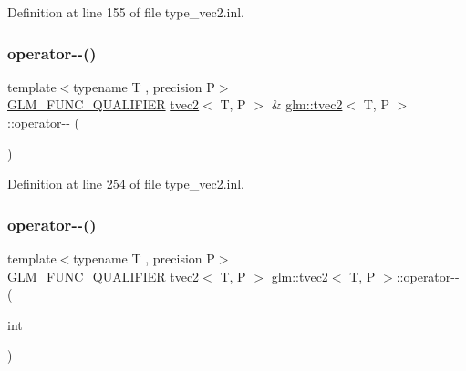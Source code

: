 Definition at line 155 of file type\+\_\+vec2.\+inl.

\mbox{\label{structglm_1_1tvec2_af751da3c19f0f22f8eb2bac9003f9384}} 
\subsubsection{\texorpdfstring{operator-\/-\/()}{operator--()}\hspace{0.1cm}{\footnotesize\ttfamily [1/2]}}
{\footnotesize\ttfamily template$<$typename T , precision P$>$ \\
\mbox{\hyperlink{setup_8hpp_a33fdea6f91c5f834105f7415e2a64407}{G\+L\+M\+\_\+\+F\+U\+N\+C\+\_\+\+Q\+U\+A\+L\+I\+F\+I\+ER}} \mbox{\hyperlink{structglm_1_1tvec2}{tvec2}}$<$ T, P $>$ \& \mbox{\hyperlink{structglm_1_1tvec2}{glm\+::tvec2}}$<$ T, P $>$\+::operator-\/-\/ (\begin{DoxyParamCaption}{ }\end{DoxyParamCaption})}



Definition at line 254 of file type\+\_\+vec2.\+inl.

\mbox{\label{structglm_1_1tvec2_a4206b03754b7b3ba80a3a9365755f882}} 
\subsubsection{\texorpdfstring{operator-\/-\/()}{operator--()}\hspace{0.1cm}{\footnotesize\ttfamily [2/2]}}
{\footnotesize\ttfamily template$<$typename T , precision P$>$ \\
\mbox{\hyperlink{setup_8hpp_a33fdea6f91c5f834105f7415e2a64407}{G\+L\+M\+\_\+\+F\+U\+N\+C\+\_\+\+Q\+U\+A\+L\+I\+F\+I\+ER}} \mbox{\hyperlink{structglm_1_1tvec2}{tvec2}}$<$ T, P $>$ \mbox{\hyperlink{structglm_1_1tvec2}{glm\+::tvec2}}$<$ T, P $>$\+::operator-\/-\/ (\begin{DoxyParamCaption}\item[{int}]{ }\end{DoxyParamCaption})}



